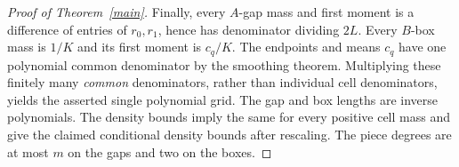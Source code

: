 \documentclass[11pt]{article}
\begin{document}
\begin{proof}[Proof of Theorem~\ref{main}]
Finally, every $A$-gap mass and first moment is a difference of entries
of $r_0,r_1$, hence has denominator dividing $2L$. Every $B$-box mass
is $1/K$ and its first moment is $c_q/K$. The endpoints and means
$c_q$ have one polynomial common denominator by the smoothing theorem.
Multiplying these finitely many \emph{common} denominators, rather than
individual cell denominators, yields the asserted single polynomial
grid. The gap and box lengths are inverse polynomials. The density
bounds imply the same for every positive cell mass and give the claimed
conditional density bounds after rescaling. The piece degrees are at
most $m$ on the gaps and two on the boxes.
\end{proof}
\end{document}
